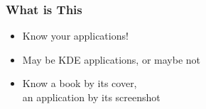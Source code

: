 \begin{frame}
 \frametitle{What is This}

	\begin{itemize}
		\item Know your applications!
		\item May be KDE applications, or maybe not
        \item Know a book by its cover,\\\quad an application by its screenshot
	\end{itemize}
\end{frame}

\newcommand*\answers{}
\newcommand*\answerimages{}
\makeatletter
{}
\def\witq#1#2#3#4#5#6{
    \begin{frame}
    \frametitle{What is This}
    \begin{columns}
    \begin{column}{0.7\textwidth}
        \vspace{-1cm}
        \begin{center}
        \noindent\texttt{[image: img/wit-\#1-q.png]}
        \end{center}
    \end{column}
    \begin{column}{0.3\textwidth}
        \bigskip
        \begin{enumerate}
            \item[A] #2
            \item[B] #3
            \item[C] #4
            \item[D] #5
            \item[E] #6
        \end{enumerate}
    \end{column}
    \end{columns}
    \end{frame}
    \def\@ansX{#1}%
    \def\@ansA{#2}%
    \def\@ansB{#3}%
    \def\@ansC{#4}%
    \def\@ansD{#5}%
    \def\@ansE{#6}%
    \stepcounter{@qnum}
    \edef\@n{\arabic{@qnum}}%
    \ifx\@ansX\@ansA\def\@a{A}%
    \else%
    \ifx\@ansX\@ansB\def\@a{B}%
    \else%
    \ifx\@ansX\@ansC\def\@a{C}%
    \else%
    \ifx\@ansX\@ansD\def\@a{D}%
    \else%
    \ifx\@ansX\@ansE\def\@a{E}%
    \else%
    \def\@a{?}%
    \fi\fi\fi\fi\fi
    \edef\@arg{{#1}{\@a}{\@n}}
    \expandafter\@witq\@arg
}
\def\@witq#1#2#3{
    \g@addto@macro\answers{\item<#3> #2 #1\pause}%
    \g@addto@macro\answerimages{\only<#3>{\noindent\texttt{[image: img/wit-\#1.png]}}}
}
\makeatother


